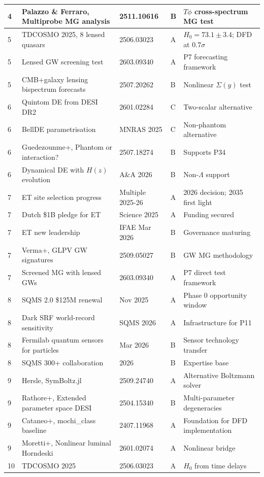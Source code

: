 \documentclass[11pt,a4paper]{article}
\begin{document}
\begin{longtable}{p{0.5cm}p{5cm}p{3cm}p{1cm}p{4cm}}
4 & Palazzo \& Ferraro, Multiprobe MG analysis & 2511.10616 & B & $T\phi$ cross-spectrum MG test \\
\midrule
5 & TDCOSMO 2025, 8 lensed quasars & 2506.03023 & A & $H_0 = 73.1 \pm 3.4$; DFD at $0.7\sigma$ \\
5 & Lensed GW screening test & 2603.09340 & A & P7 forecasting framework \\
5 & CMB+galaxy lensing bispectrum forecasts & 2507.20262 & B & Nonlinear $\Sigma(y)$ test \\
\midrule
6 & Quintom DE from DESI DR2 & 2601.02284 & C & Two-scalar alternative \\
6 & BellDE parametrisation & MNRAS 2025 & C & Non-phantom alternative \\
6 & Guedezounme+, Phantom or interaction? & 2507.18274 & B & Supports P34 \\
6 & Dynamical DE with $H(z)$ evolution & A\&A 2026 & B & Non-$\Lambda$ support \\
\midrule
7 & ET site selection progress & Multiple 2025-26 & A & 2026 decision; 2035 first light \\
7 & Dutch \$1B pledge for ET & Science 2025 & A & Funding secured \\
7 & ET new leadership & IFAE Mar 2026 & B & Governance maturing \\
7 & Verma+, GLPV GW signatures & 2509.05027 & B & GW MG methodology \\
7 & Screened MG with lensed GWs & 2603.09340 & A & P7 direct test framework \\
\midrule
8 & SQMS 2.0 \$125M renewal & Nov 2025 & A & Phase 0 opportunity window \\
8 & Dark SRF world-record sensitivity & SQMS 2026 & A & Infrastructure for P11 \\
8 & Fermilab quantum sensors for particles & Mar 2026 & B & Sensor technology transfer \\
8 & SQMS 300+ collaboration & 2026 & B & Expertise base \\
\midrule
9 & Hersle, SymBoltz.jl & 2509.24740 & A & Alternative Boltzmann solver \\
9 & Rathore+, Extended parameter space DESI & 2504.15340 & B & Multi-parameter degeneracies \\
9 & Cataneo+, mochi\_class baseline & 2407.11968 & A & Foundation for DFD implementation \\
9 & Moretti+, Nonlinear luminal Horndeski & 2601.02074 & A & Nonlinear bridge \\
\midrule
10 & TDCOSMO 2025 & 2506.03023 & A & $H_0$ from time delays \\

\end{longtable}
\end{document}
